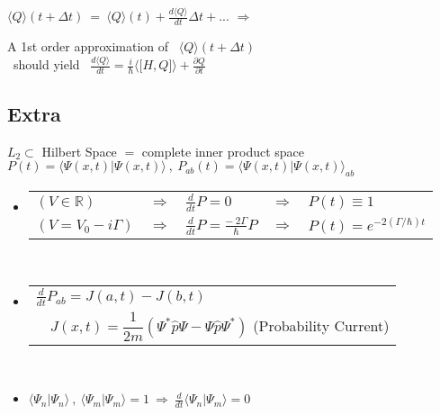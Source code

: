 \documentclass[12pt]{article}
\begin{document}
\vspace{5pt}
\noindent \( 
    \big\langle Q \big\rangle {\scriptstyle (t + \Delta t)} 
    \ = \ \big\langle Q \big\rangle {\scriptstyle (t)}
    + \frac{d \langle Q \rangle}{dt} \Delta t + ... 
\) 
\hspace{5pt} \(\Rightarrow\) \hspace{5pt}
\begin{minipage}{.5\textwidth}
    A 1st order approximation of \ \( \big\langle Q \big\rangle {\scriptstyle (t + \Delta t)} \) \\[5pt]
    \ should yield \ \( \frac{d \langle Q \rangle}{dt}
        = \frac{i}{\hbar} \Big\langle \big[H,Q \big] \Big\rangle + \frac{\partial Q}{\partial t} \)
\end{minipage}

\newpage \noindent
\subsection{Extra}
\hfill \break
\(L_2 \subset \) Hilbert Space \(=\) complete inner product space\\[10pt]
\( P(t) = \Big\langle \Psi(x,t) \Big| \Psi(x,t) \Big\rangle \ , \  
    P_{ab}(t) = \Big\langle \Psi(x,t) \Big| \Psi(x,t) \Big\rangle _{ab} \)
\begin{itemize}
    \item \begin{tabular}{l c l c l}
            \( (V \in \mathbb{R}) \) & \(\Rightarrow\) 
                & \( \frac{d}{dt} P = 0\) 
                & \(\Rightarrow\) & \( P(t) \equiv 1 \)\\[10pt]
            \( (V = V_0 - i\Gamma) \) & \(\Rightarrow\) 
                & \( \frac{d}{dt} P = \frac{- \ 2\Gamma}{\hbar} P \) 
                & \(\Rightarrow\) & \( P(t) = e^{-2 (\Gamma / \hbar) t}\)
        \end{tabular} \\[10pt]
    \item \begin{tabular}{m{.25cm} l}
            \multicolumn{2}{l}{\( \frac{d}{dt} P_{ab} = J(a,t) - J(b,t) \)}\\[5pt]
            & \( J(x,t) = \dfrac{1}{2m} ( \Psi^* \hat{p} \Psi - \Psi \hat{p} \Psi^* ) \) 
                \hspace{1cm} {\scriptsize (Probability Current)}
        \end{tabular} \\[7pt]
    \item \( \langle \Psi_n | \Psi_n \rangle \ , \ \langle \Psi_m | \Psi_m \rangle = 1 
        \ \Rightarrow \ \frac{d}{dt} \langle \Psi_n | \Psi_m \rangle = 0 \)
\end{itemize}
\end{document}
